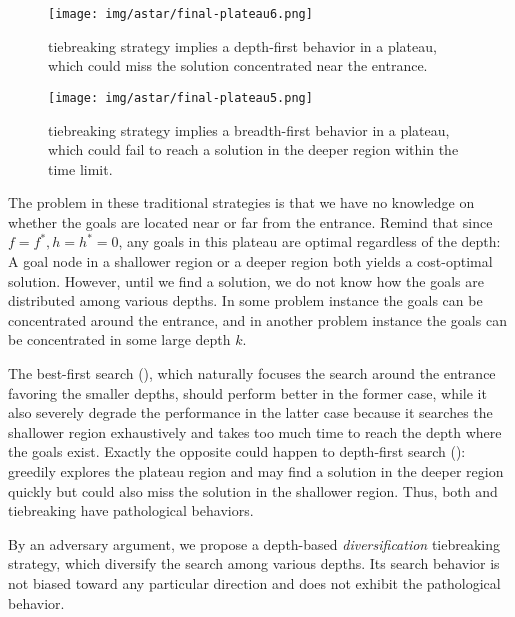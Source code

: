 \begin{figure}[htbp]
 \centering
 \texttt{[image: img/astar/final-plateau6.png]}
 \caption{\lifo tiebreaking strategy implies a depth-first behavior in a
 plateau, which could miss the solution concentrated near the entrance.}
 \label{fig:plateau-depiction-lifo}
\end{figure}

\begin{figure}[htbp]
 \centering
 \texttt{[image: img/astar/final-plateau5.png]}
 \caption{\fifo tiebreaking strategy implies a breadth-first behavior in a
 plateau, which could fail to reach a solution in the deeper region
 within the time limit.}
 \label{fig:plateau-depiction-fifo}
\end{figure}

The problem in these traditional strategies is that we have no knowledge
on whether the goals are located near or far from the entrance. Remind
that since $f=f^*, h=h^*=0$, any goals in this plateau are optimal
regardless of the depth: A goal node in a shallower region or a deeper
region both yields a cost-optimal solution. However, until we find a
solution, we do not know how the goals are distributed among various
depths. In some problem instance the goals can be concentrated around
the entrance, and in another problem instance the goals can be
concentrated in some large depth $k$.


The best-first search (\fifo), which naturally focuses the search around
the entrance favoring the smaller depths, should perform better in the
former case, while it also severely degrade the performance in the
latter case because it searches the
shallower region exhaustively and takes too much time to reach the depth
where the goals exist.
Exactly the opposite could happen to depth-first search (\lifo):
\lifo greedily explores the
plateau region and may find a solution in the deeper region quickly but
could also miss the solution in the shallower region.
Thus, both \fifo and \lifo tiebreaking have pathological behaviors.

By an adversary argument, we propose a depth-based \emph{diversification}
tiebreaking strategy, which diversify the search among various depths.
Its search behavior is not biased toward any particular direction and
does not exhibit the pathological behavior.

